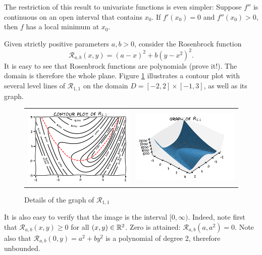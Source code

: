 \begin{remark}
The restriction of this result to univariate functions is even simpler: Suppose $f''$ is continuous on an open interval that contains $x_0$.  If $f'(x_0)=0$ and $f''(x_0)>0$, then $f$ has a local minimum at $x_0$. 
\end{remark}

\begin{example}\label{example:Rosenbrock}
Given strictly positive parameters $a,b > 0$, consider the Rosenbrock function 
\begin{equation*} 
\mathcal{R}_{a,b}(x, y) = (a-x)^2 + b(y-x^2)^2.
\end{equation*}
It is easy to see that Rosenbrock functions are polynomials (prove it!).  The domain is therefore the whole plane. Figure \ref{figure:Rosenbrock} illustrates a contour plot with several level lines of $\mathcal{R}_{1,1}$ on the domain $D = [-2,2] \times [-1,3]$, as well as its graph.

\begin{figure}[ht!]
\begin{tabular}{cc}
\includegraphics[width=0.5\linewidth]{images/rosenbrockContour} &
\includegraphics[width=0.5\linewidth]{images/rosenbrockGraph}
\end{tabular}
\caption{Details of the graph of $\mathcal{R}_{1,1}$}
\label{figure:Rosenbrock}
\end{figure}
It is also easy to verify that the image is the interval $[0,\infty)$.  Indeed, note first that $\mathcal{R}_{a,b}(x,y) \geq 0$ for all $(x,y) \in \mathbb{R}^2$.  Zero is attained: $\mathcal{R}_{a,b} (a,a^2) = 0$.  Note also that $\mathcal{R}_{a,b}(0,y) = a^2 + by^2$ is a polynomial of degree 2, therefore unbounded.


\end{example}
